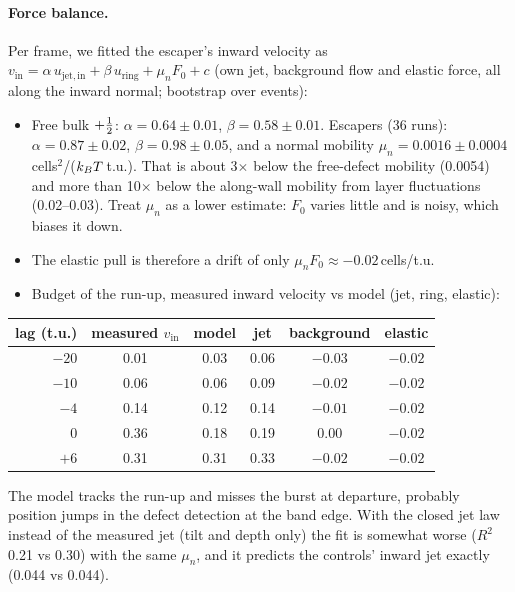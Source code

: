 \paragraph{Force balance.} Per frame, we fitted the escaper's inward velocity as $v_\mathrm{in}=\alpha\,u_\mathrm{jet,in}+\beta\,u_\mathrm{ring}+\mu_n F_0+c$
(own jet, background flow and elastic force, all along the inward normal; bootstrap over events):
\begin{itemize}
  \item Free bulk $+\tfrac12$: $\alpha=0.64\pm0.01$, $\beta=0.58\pm0.01$. Escapers (36 runs): $\alpha=0.87\pm0.02$, $\beta=0.98\pm0.05$, and a normal mobility $\mu_n=0.0016\pm0.0004$\,cells$^2$/($k_BT$\,t.u.).
        That is about 3$\times$ below the free-defect mobility (0.0054) and more than 10$\times$ below the along-wall mobility from layer fluctuations (0.02--0.03). Treat $\mu_n$ as a lower estimate:
        $F_0$ varies little and is noisy, which biases it down.
  \item The elastic pull is therefore a drift of only $\mu_nF_0\approx-0.02$\,cells/t.u.
  \item Budget of the run-up, measured inward velocity vs model (jet, ring, elastic):
\end{itemize}
\begin{table}[H]\centering\small
\begin{tabular}{@{}rccccc@{}}\toprule
lag (t.u.) & measured $v_\mathrm{in}$ & model & jet & background & elastic \\ \midrule
$-20$ & 0.01 & 0.03 & 0.06 & $-0.03$ & $-0.02$ \\
$-10$ & 0.06 & 0.06 & 0.09 & $-0.02$ & $-0.02$ \\
$-4$  & 0.14 & 0.12 & 0.14 & $-0.01$ & $-0.02$ \\
0     & 0.36 & 0.18 & 0.19 & 0.00 & $-0.02$ \\
$+6$  & 0.31 & 0.31 & 0.33 & $-0.02$ & $-0.02$ \\ \bottomrule
\end{tabular}
\end{table}
\noindent The model tracks the run-up and misses the burst at departure, probably position jumps in the defect detection at the band edge. With the closed jet law instead of the measured jet
(tilt and depth only) the fit is somewhat worse ($R^2$ 0.21 vs 0.30) with the same $\mu_n$, and it predicts the controls' inward jet exactly (0.044 vs 0.044).


